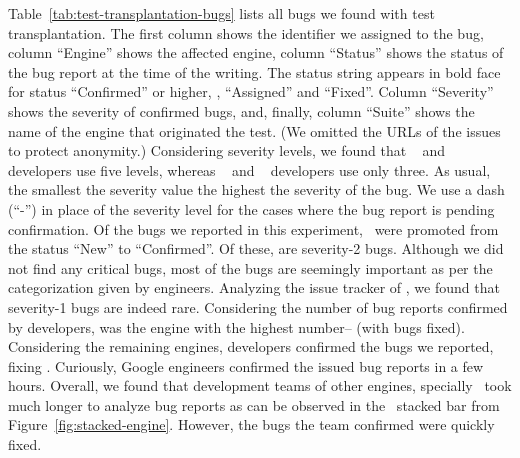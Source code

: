 \documentclass[smallextended]{svjour3}
\begin{document}
Table~\ref{tab:test-transplantation-bugs} lists all bugs we found with
test transplantation. The first column shows the identifier we
assigned to the bug, column ``Engine'' shows the
affected engine, column ``Status'' shows the status of the bug report
at the time of the writing. The status string appears in bold face for
status ``Confirmed'' or higher, \ie{}, ``Assigned'' and ``Fixed''.
Column ``Severity'' shows the severity of confirmed bugs, and,
finally, column ``Suite'' shows the name of the engine that originated
the test.  (We omitted the URLs of the issues to protect anonymity.)
Considering severity levels, we found that \jsc~\cite{jsc-severity}
and \smonkey{}~\cite{mozilla-severity} developers use five levels,
whereas \chakra{}~\cite{chakra-severity} and
\veight{}~\cite{v8-severity} developers use only three. As usual, the
smallest the severity value the highest the severity of the bug. We
use a dash (``-'') in place of the severity level for the cases where
the bug report is pending confirmation. Of the
\noBugsTransplantation{} bugs we reported in this experiment,
\noBugsTransplantationConfirmed\ were promoted from the status ``New''
to ``Confirmed''. Of these, \noBugsTransplantationSeverityTwo{} are severity-2 bugs.  Although we did
not find any critical bugs, most of the bugs are seemingly important
as per the categorization given by engineers. Analyzing the issue
tracker of \chakra, we found that severity-1 bugs are indeed
rare. Considering the number of bug reports confirmed by developers,
\chakra{} was the engine with the highest number--\bugsChakra{} (with \bugsChakraFixed{} bugs
fixed). Considering the remaining engines, \veight{} developers
confirmed the \noTransVeightBugsReported{} bugs we reported, fixing
\noTransVeightBugsFixed{}. Curiously, Google
engineers confirmed the issued bug reports in a few hours. Overall, we
found that development teams of other engines, specially \jsc\, took
much longer to analyze bug reports as can be observed in the
\jsc\ stacked bar from Figure~\ref{fig:stacked-engine}.
However, the bugs the \jsc team confirmed were quickly fixed.

\end{document}
